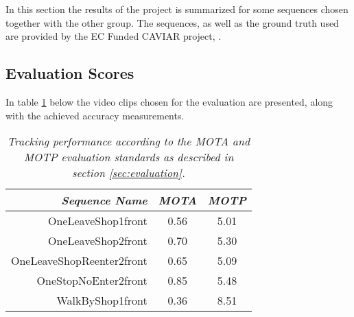 In this section the results of the project is summarized for some sequences chosen together with the other group. The sequences, as well as the ground truth used are provided by the EC Funded CAVIAR project, \cite{CAVIAR}.

\subsection{Evaluation Scores}
In table \ref{tab:evaluation_performance} below the video clips chosen for the evaluation are presented, along with the achieved accuracy measurements.

\begin{table}[h]
\centering
	\begin{tabular}{r | c | c }
		\emph{Sequence Name}		& \emph{MOTA} & \emph{MOTP} \\
		\hline \hline
		OneLeaveShop1front			& 0.56 & 5.01 \\
		OneLeaveShop2front			& 0.70 & 5.30 \\
		OneLeaveShopReenter2front	& 0.65 & 5.09 \\
		OneStopNoEnter2front 		& 0.85 & 5.48 \\
		WalkByShop1front 			& 0.36 & 8.51 \\
	\end{tabular}
	\caption{\textit{Tracking performance according to the MOTA and MOTP evaluation standards as described in section \ref{sec:evaluation}.}}
	\label{tab:evaluation_performance}
\end{table}


